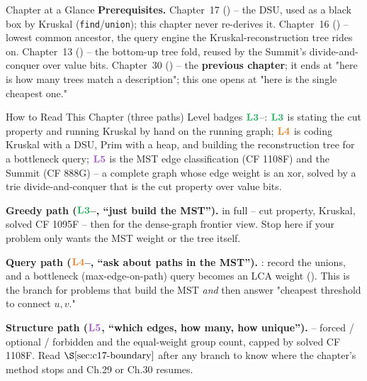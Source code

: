 \begin{chaptertheorybox}{Chapter at a Glance}
\textbf{Prerequisites.} Chapter~17 () -- the DSU, used as a black box
by Kruskal (\texttt{find}/\texttt{union}); this chapter never re-derives it.
Chapter~16 () -- lowest common ancestor, the query engine the
Kruskal-reconstruction tree rides on.  Chapter~13 () -- the bottom-up
tree fold, reused by the Summit's divide-and-conquer over value bits.  Chapter~30
() -- the \textbf{previous chapter}; it ends at "here is how many
trees match a description"; this one opens at "here is the single cheapest one."
\end{chaptertheorybox}

\begin{chaptertheorybox}{How to Read This Chapter (three paths)}
Level badges \(\lv3\)--: \(\lv3\) is stating the cut property and running
Kruskal by hand on the running graph; \(\lv4\) is coding Kruskal with a DSU,
Prim with a heap, and building the reconstruction tree for a bottleneck query;
\(\lv5\) is the MST edge classification (CF 1108F) and the Summit (CF 888G) -- a
complete graph whose edge weight is an xor, solved by a trie divide-and-conquer
that is the cut property over value bits.

\textbf{Greedy path (\(\lv3\)--, ``just build the MST'').}
 in full -- cut property, Kruskal, solved CF 1095F -- then
 for the dense-graph frontier view.  Stop here if your problem
only wants the MST weight or the tree itself.

\textbf{Query path (\(\lv4\)--, ``ask about paths in the MST'').}
: record the unions, and a bottleneck (max-edge-on-path) query
becomes an LCA weight ().  This is the branch for problems that build
the MST \emph{and} then answer "cheapest threshold to connect \(u,v\)."

\textbf{Structure path (\(\lv5\), ``which edges, how many, how unique'').}
 -- forced / optional / forbidden and the equal-weight group
count, capped by solved CF 1108F.  Read \(\secref{c17-boundary}\) after any
branch to know where the chapter's method stops and Ch.29 or Ch.30 resumes.
\end{chaptertheorybox}

